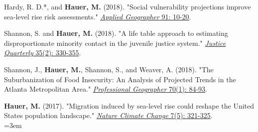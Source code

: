 \begin{etaremune}
\item Hardy, R. D.*, and \textbf{Hauer, M.} (2018). "Social vulnerability projections improve sea-level rise risk assessments." \href{https://www.sciencedirect.com/science/article/pii/S0143622817309189}{\textit{Applied Geographer} 91: 10-20}.

\item Shannon, S. and \textbf{Hauer, M.} (2018). "A life table approach to estimating disproportionate minority contact in the juvenile justice system." \href{http://www.tandfonline.com/doi/full/10.1080/07418825.2017.1315163}{\textit{Justice Quarterly} 35(2): 330-355}.

\item Shannon, J., \textbf{Hauer, M.}, Shannon, S., and Weaver, A. (2018). "The Suburbanization of Food Insecurity: An Analysis of Projected     Trends in the Atlanta Metropolitan Area." \href{http://www.tandfonline.com/doi/full/10.1080/00330124.2017.1325751}{\textit{Professional Geographer} 70(1): 84-93}.

\item \textbf{Hauer, M.} (2017). "Migration induced by sea-level rise could reshape the United States population landscape." \href{http://dx.doi.org/10.1038/nclimate3271}{\textit{Nature Climate Change} 7(5): 321-325}.\\
        \hangindent=3em \\


\end{etaremune}
